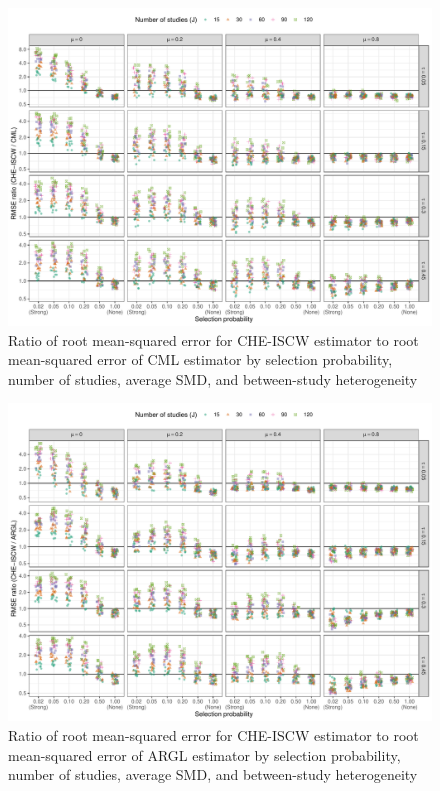 \documentclass[
  american,
  man, donotrepeattitle,floatsintext]{apa7}
\begin{document}
\begin{figure}
\includegraphics{step-function-selection-models-with-dependent-effects_files/figure-latex/rmse-CHE-CML-1} \caption{Ratio of root mean-squared error for CHE-ISCW estimator to root mean-squared error of CML estimator by selection probability, number of studies, average SMD, and between-study heterogeneity}\label{fig:rmse-CHE-CML}
\end{figure}

\begin{figure}
\includegraphics{step-function-selection-models-with-dependent-effects_files/figure-latex/rmse-CHE-ARGL-1} \caption{Ratio of root mean-squared error for CHE-ISCW estimator to root mean-squared error of ARGL estimator by selection probability, number of studies, average SMD, and between-study heterogeneity}\label{fig:rmse-CHE-ARGL}
\end{figure}
\end{document}
